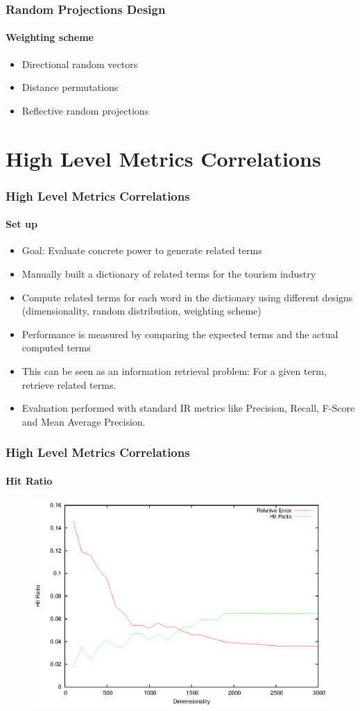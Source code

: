 \documentclass{beamer}
\begin{document}
\begin{frame}
\frametitle{Random Projections Design}
\framesubtitle{Weighting scheme}

\begin{itemize}
  \item Directional random vectors
  \item Distance permutations
  \item Reflective random projections
\end{itemize}
\end{frame} 

\section{High Level Metrics Correlations}
\begin{frame}
\frametitle{High Level Metrics Correlations}
\framesubtitle{Set up}
\begin{itemize}
  \item Goal: Evaluate concrete power to generate related terms
  \item Manually built a dictionary of related terms for the tourism industry
  \item Compute related terms for each word in the dictionary using different designs (dimensionality, random distribution, weighting scheme)
  \item Performance is measured by comparing the expected terms and the actual computed terms
  \item This can be seen as an information retrieval problem: For a given term, retrieve related terms.
  \item Evaluation performed with standard IR metrics like Precision, Recall, F-Score and Mean Average Precision.
\end{itemize}
\end{frame}


\begin{frame}
\frametitle{High Level Metrics Correlations}
\framesubtitle{Hit Ratio}
 		\begin{figure}
		\includegraphics[scale=0.88]{hr.eps}
	\end{figure}
\end{frame}
\end{document}
